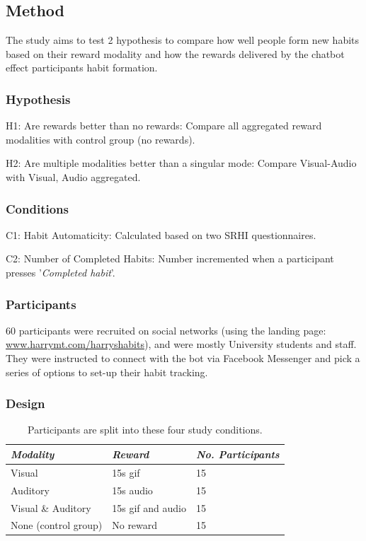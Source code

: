 \documentclass{scaffold/sigchi}
\begin{document}
\subsection{Method}
The study aims to test 2 hypothesis to compare how well people form new habits based on their reward modality and how the rewards delivered by the chatbot effect participants habit formation.

\subsubsection{Hypothesis}
H1: Are rewards better than no rewards: Compare all aggregated reward modalities with control group (no rewards).


H2: Are multiple modalities better than a singular mode: Compare Visual-Audio with Visual, Audio aggregated.

\subsubsection{Conditions}
C1: Habit Automaticity: Calculated based on two SRHI questionnaires.


C2: Number of Completed Habits: Number incremented when a participant presses '\textit{Completed habit}'.

\subsubsection{Participants}
60 participants were recruited on social networks (using the landing page: \url{www.harrymt.com/harryshabits}), and were mostly University students and staff. They were instructed to connect with the bot via Facebook Messenger and pick a series of options to set-up their habit tracking.



\subsubsection{Design}


\begin{table}
  \centering
  \begin{tabular}{l l l}
    {\small\textit{Modality}} & {\small \textit{Reward}} & {\small \textit{No. Participants}}\\
    \midrule
    Visual & 15s gif & 15 \\
    Auditory & 15s audio & 15 \\
    Visual \& Auditory & 15s gif and audio & 15 \\
    None (control group) & No reward & 15 \\
  \end{tabular}
  \caption{Participants are split into these four study conditions.}~\label{tab:precise_rewards}
\end{table}
\end{document}
